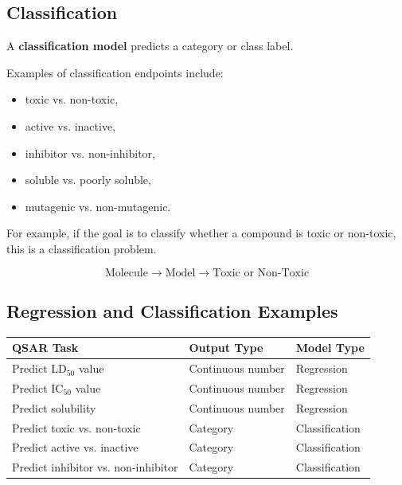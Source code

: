 \documentclass[11pt]{report}
\newenvironment{Important note}{\begin{quote}\color{red}\textbf{Important note:} }{\end{quote}}
\begin{document}
\subsection{Classification}

A \textbf{classification model} predicts a category or class label.

Examples of classification endpoints include:

\begin{itemize}[leftmargin=*]
    \item toxic vs. non-toxic,
    \item active vs. inactive,
    \item inhibitor vs. non-inhibitor,
    \item soluble vs. poorly soluble,
    \item mutagenic vs. non-mutagenic.
\end{itemize}

For example, if the goal is to classify whether a compound is toxic or non-toxic, this is a classification problem.

\[
\text{Molecule} \rightarrow \text{Model} \rightarrow \text{Toxic or Non-Toxic}
\]

\subsection*{Regression and Classification Examples}

\begin{center}
\begin{tabular}{lll}
\toprule
\textbf{QSAR Task} & \textbf{Output Type} & \textbf{Model Type} \\
\midrule
Predict LD$_{50}$ value & Continuous number & Regression \\
Predict IC$_{50}$ value & Continuous number & Regression \\
Predict solubility & Continuous number & Regression \\
Predict toxic vs. non-toxic & Category & Classification \\
Predict active vs. inactive & Category & Classification \\
Predict inhibitor vs. non-inhibitor & Category & Classification \\
\bottomrule
\end{tabular}
\end{center}
\end{document}
